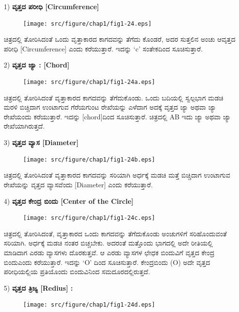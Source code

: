 \begin{enumerate}
\item[1)] \textbf{ವೃತ್ತದ ಪರೀಧಿ [Circumference]} 
\begin{figure}[H]
\centering
\texttt{[image: src/figure/chap1/fig1-24.eps]}
\end{figure}
 
 ಚಿತ್ರದಲ್ಲಿ ತೋರಿಸಿದಂತೆ ಒಂದು ವೃತ್ತಾಕಾರದ ಕಾಗದವನ್ನು ತೆಗೆದು ಕೊಂಡರೆ, ಅದರ ಸುತ್ತಲಿನ ಅಂಚು ಆವೃತ್ತದ ಪರೀಧಿ [Circumference] ಎಂದು ಕರೆಯುತ್ತಾರೆ. ಇದನ್ನು `c' ಸಂತೇಕದಿಂದ ಸೂಚಿಸುತ್ತಾರೆ. 
 
\item[2)] \textbf{ವೃತ್ತದ ಜ್ಯಾ : [Chord]}
\begin{figure}[H]
\centering
\texttt{[image: src/figure/chap1/fig1-24a.eps]}
\end{figure}
 
 ಚಿತ್ರದಲ್ಲಿ ತೋರಿಸಿದಂತೆ ವೃತ್ತಾಕಾರದ ಕಾಗದವನ್ನು ತೆಗೆದುಕೊಂಡು. ಒಂದು ಬದಿಯಲ್ಲಿ ಸ್ವಲ್ಪಭಾಗ ಮಡಚಿ ಮರಳಿ ಬಿಚ್ಚಿದಾಗ ಉಂಟಾಗುವ ಗೆರೆಯಗುಂಟ ರೇಖೆಯನ್ನು ಎಳೆದಾಗ ಅದಕ್ಕೆ ವೃತ್ತದ ಜ್ಯಾ ಅಥವಾ ಜ್ಯಾ ರೇಖೆಯಂದು ಕರೆಯುತ್ತಾರೆ. ಇದನ್ನು [chord]ದಿಂದ ಸೂಚಿಸುತ್ತಾರೆ. ಚಿತ್ರದಲ್ಲಿ AB ಇದು ಜ್ಯಾ ಅಥವಾ ಜ್ಯಾ ರೇಖೆಯಾಗಿರುತ್ತದೆ. 
 
\item[3)] \textbf{ವೃತ್ತದ ವ್ಯಾಸ [Diameter]}
\begin{figure}[H]
\centering
\texttt{[image: src/figure/chap1/fig1-24b.eps]}
\end{figure} 

 ಚಿತ್ರದಲ್ಲಿ ತೋರಿಸಿದಂತೆ ವೃತ್ತಾಕಾರದ ಕಾಗದವನ್ನು ಸರಿಯಾಗಿ ಅರ್ಧಕ್ಕೆ ಮಡಚಿ ಮತ್ತೆ ಬಿಚ್ಚಿದಾಗ ಉಂಟಾಗುವ ರೇಖೆಯನ್ನು ವೃತ್ತದ ವ್ಯಾಸವೆಂದು [Diameter] ಎಂದು ಕರೆಯುತ್ತಾರೆ. 

\item[4)] \textbf{ವೃತ್ತದ ಕೇಂದ್ರ ಬಿಂದು [Center of the Circle]}
\begin{figure}[H]
\centering
\texttt{[image: src/figure/chap1/fig1-24c.eps]}
\end{figure}
 
 ಚಿತ್ರದಲ್ಲಿ ತೋರಿಸಿದಂತೆ, ವೃತ್ತಾಕಾರದ ಒಂದು ಕಾಗದವನ್ನು ತೆಗೆದುಕೊಂಡು ಅಂಚು\-ಗಳಿಗೆ ಸರಿಹೊಂದುವಂತೆ ಸರಿಯಾಗಿ. ಅರ್ಧಕ್ಕೆ ಮಡಚಿ ನಂತರ ಬಿಚ್ಚಬೇಕು. ಅದ\-ರಂತೆ ಮತ್ತೊಂದು ಭಾಗದಲ್ಲಿ ಅದೇ ರೀತಿಯಲ್ಲಿ ಮಾಡಿದಾಗ ಎರಡು ವ್ಯಾಸಗಳು ದೊರ\-ಕುತ್ತವೆ. ಆ ಎರಡು ವ್ಯಾಸಗಳ ಛೇಧಕ ಬಿಂದುವಿಗೆ ವೃತ್ತದ ಕೇಂದ್ರ ಬಿಂದು\break ಎಂದು ಕರೆಯುತ್ತಾರೆ. ಇದನ್ನು `O' ದಿಂದ ಸೂಚಿಸುತ್ತಾರೆ. ಕೇಂದ್ರಬಿಂದು (O) ಅದೇ ವೃತ್ತದ ಪರೀಧಿಯಲ್ಲಿಯ ಪ್ರತಿಯೊಂದು ಬಿಂದುವಿನಿಂದ ಸಮದೂರದಲ್ಲಿರುತ್ತದೆ. 
 
\newpage 
\eject
 
\item[5)] \textbf{ವೃತ್ತದ ತ್ರಿಜ್ಯ [Redius] :}
\begin{figure}[H]
\centering
\texttt{[image: src/figure/chap1/fig1-24d.eps]}
\end{figure}
	

\end{enumerate}
